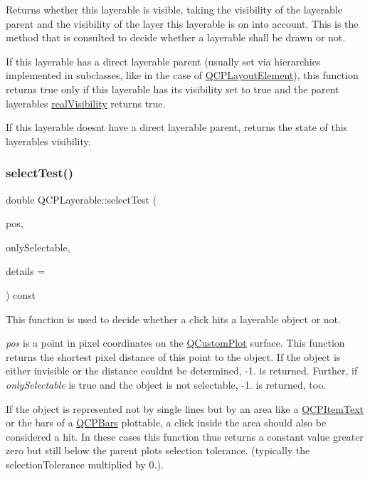Returns whether this layerable is visible, taking the visibility of the layerable parent and the visibility of the layer this layerable is on into account. This is the method that is consulted to decide whether a layerable shall be drawn or not.

If this layerable has a direct layerable parent (usually set via hierarchies implemented in subclasses, like in the case of \hyperlink{class_q_c_p_layout_element}{Q\+C\+P\+Layout\+Element}), this function returns true only if this layerable has its visibility set to true and the parent layerable\textquotesingle{}s \hyperlink{class_q_c_p_layerable_ab054e88f15d485defcb95e7376f119e7}{real\+Visibility} returns true.

If this layerable doesn\textquotesingle{}t have a direct layerable parent, returns the state of this layerable\textquotesingle{}s visibility. \hypertarget{class_q_c_p_layerable_a04db8351fefd44cfdb77958e75c6288e}{}\label{class_q_c_p_layerable_a04db8351fefd44cfdb77958e75c6288e} 
\subsubsection{\texorpdfstring{select\+Test()}{selectTest()}}
{\footnotesize\ttfamily double Q\+C\+P\+Layerable\+::select\+Test (\begin{DoxyParamCaption}\item[{const Q\+PointF \&}]{pos,  }\item[{bool}]{only\+Selectable,  }\item[{Q\+Variant $\ast$}]{details = {} }\end{DoxyParamCaption}) const\hspace{0.3cm}{\ttfamily [virtual]}}

This function is used to decide whether a click hits a layerable object or not.

{\itshape pos} is a point in pixel coordinates on the \hyperlink{class_q_custom_plot}{Q\+Custom\+Plot} surface. This function returns the shortest pixel distance of this point to the object. If the object is either invisible or the distance couldn\textquotesingle{}t be determined, -\/1. is returned. Further, if {\itshape only\+Selectable} is true and the object is not selectable, -\/1. is returned, too.

If the object is represented not by single lines but by an area like a \hyperlink{class_q_c_p_item_text}{Q\+C\+P\+Item\+Text} or the bars of a \hyperlink{class_q_c_p_bars}{Q\+C\+P\+Bars} plottable, a click inside the area should also be considered a hit. In these cases this function thus returns a constant value greater zero but still below the parent plot\textquotesingle{}s selection tolerance. (typically the selection\+Tolerance multiplied by 0.).

